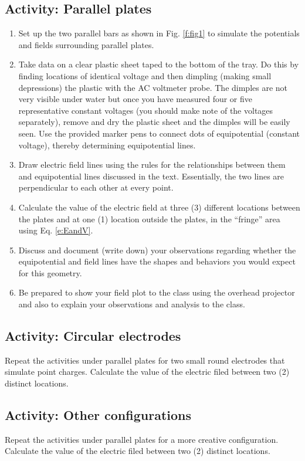 \subsection{Activity: Parallel plates} %
\begin{enumerate}
	 \item Set up the two parallel bars as shown in Fig. \ref{f:fig1} to simulate the potentials and fields surrounding parallel plates.
	 \item  Take data on a clear plastic sheet taped to the bottom of the tray.  Do this by finding locations of identical voltage and then dimpling (making small depressions) the plastic with the AC voltmeter probe.  
	 The dimples are not very visible under water but once you have measured four or five representative constant voltages (you should make note of the voltages separately), remove and dry the plastic sheet and the dimples will be easily seen.  
	 Use the provided marker pens to connect dots of equipotential (constant voltage), thereby determining equipotential lines.
	  \item Draw electric field lines using the rules for the relationships between them and equipotential lines discussed in the text. Essentially, the two lines are perpendicular to each other at every point.
	 \item Calculate the value of the electric field at three (3) different locations between the plates and at one (1) location outside the plates, in the ``fringe'' area using Eq. \ref{e:EandV}.
	\item Discuss and document (write down) your observations regarding whether the equipotential and field lines have the shapes and behaviors you would expect for this geometry.
	\item Be prepared to show your field plot to the class using the overhead projector and also to explain your observations and analysis to the class.
\end{enumerate}

\subsection{Activity: Circular electrodes}
Repeat the activities under parallel plates for two small round electrodes that simulate point charges. Calculate the value of the electric filed between two (2) distinct locations.

\subsection{Activity: Other configurations}
Repeat the activities under parallel plates for a more creative configuration. Calculate the value of the electric filed between two (2) distinct locations.


